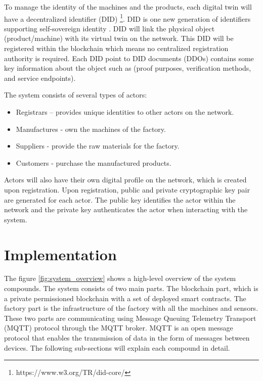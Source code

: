 \documentclass[runningheads]{llncs}
\begin{document}
\bigbreak

\noindent
To manage the identity of the machines and the products, each digital twin will have a decentralized identifier (DID) \footnote{https://www.w3.org/TR/did-core/}. DID is one new generation of identifiers supporting self-sovereign identity \cite{Bartolomeu2019}. DID will link the physical object (product/machine) with its virtual twin on the network. This DID will be registered within the blockchain which means no centralized registration authority is required. Each DID point to DID documents (DDOs) contains some key information about the object such as (proof purposes, verification methods, and service endpoints). 


\bigbreak

\noindent The system consists of several types of actors:
\begin{itemize}
  \item Registrars – provides unique identities to other actors on the network.
  \item Manufactures - own the machines of the factory.
  \item Suppliers - provide the raw materials for the factory.
  \item Customers - purchase the manufactured products.
\end{itemize}

\noindent Actors will also have their own digital profile on the network, which is created upon registration. Upon registration,  public and private cryptographic key pair are generated for each actor. The public key identifies the actor within the network and the private key authenticates the actor when interacting with the system.

\section{Implementation}
The figure \ref{fig:system_overview} shows a high-level overview of the system compounds. The system consists of two main parts. The blockchain part, which is a private permissioned blockchain with a set of deployed smart contracts. The factory part is the infrastructure of the factory with all the machines and sensors. These two parts are communicating using Message Queuing Telemetry Transport (MQTT) protocol through the MQTT broker. MQTT is an open message protocol that enables the transmission of data in the form of messages between devices. The following sub-sections will explain each compound in detail.
\end{document}
